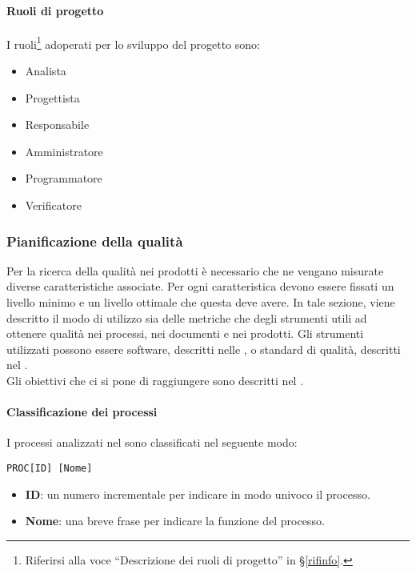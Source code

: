 			\paragraph{Ruoli di progetto}
			I ruoli\footnote{Riferirsi alla voce ``Descrizione dei ruoli di progetto'' in \S\ref{rifinfo}.} adoperati per lo sviluppo del progetto sono:
			\begin{itemize}[noitemsep]
				\item Analista
				\item Progettista
				\item Responsabile
				\item Amministratore
				\item Programmatore
				\item Verificatore
			\end{itemize}


		\subsubsection{Pianificazione della qualità}\label{Pianificazione qualita}
		Per la ricerca della qualità nei prodotti è necessario che ne vengano misurate diverse caratteristiche associate.
		Per ogni caratteristica devono essere fissati un livello minimo e un livello ottimale che questa deve avere.
		In tale sezione, viene descritto il modo di utilizzo sia delle metriche che degli strumenti utili ad ottenere qualità nei processi, nei documenti e nei prodotti.
		Gli strumenti utilizzati possono essere software, descritti nelle \Doc{\NdPv}, o standard di qualità, descritti nel \Doc{\PdQv}.\\
		Gli obiettivi che ci si pone di raggiungere sono descritti nel \Doc{\PdQv}.

			\paragraph{Classificazione dei processi}
			I processi analizzati nel \Doc{\PdQv} sono classificati nel seguente modo:

			\begin{center}
				\texttt{PROC[ID] [Nome]}
			\end{center}

			\begin{itemize}
				\item \textbf{ID}: un numero incrementale per indicare in modo univoco il processo.
				\item \textbf{Nome}: una breve frase per indicare la funzione del processo.
			\end{itemize}

